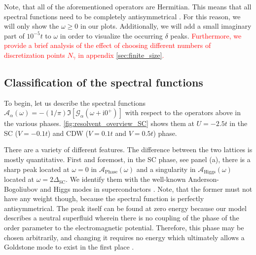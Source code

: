 \documentclass[
    reprint, 
    aps,
    preprintnumbers,
    twocolumn,
    prb,
    superscriptaddress
]{revtex4-2}
\newcommand{\im}{\mathrm{i}}
\newcommand{\spectral}[1]{\mathcal{A}_\text{#1}  (\omega)}
\newcommand{\markEdited}{red}
\begin{document}
Note, that all of the aforementioned operators are Hermitian. 
This means that all spectral functions need to be completely antisymmetrical \cite{rickayzen80}.%
For this reason, we will only show the $\omega \geq 0$ in our plots. 
Additionally, we will add a small imaginary part of $10^{-5}t$ to $\omega$ in order to visualize the occurring $\delta$ peaks.
\textcolor{\markEdited}{Furthermore, we provide a brief analysis of the effect of choosing different numbers of discretization points $N_\gamma$ in appendix \ref{sec:finite_size}.}


\subsection{Classification of the spectral functions}

To begin, let us describe the spectral functions $\mathcal{A}_\alpha (\omega) = - (1/\pi) \Im [\mathcal{G}_\alpha (\omega + \im 0^+)]$ with respect to the operators above in the various phases.
\autoref{fig:resolvent_overview_SC} shows them at $U = -2.5t$ in the SC ($V=-0.1t$) and CDW ($V=0.1t$ and $V=0.5t$) phase.

There are a variety of different features. The difference between the two lattices is mostly quantitative.
First and foremost, in the SC phase, see panel (a), 
there is a sharp peak located at $\omega=0$ in $\spectral{Phase}$ and a singularity in $\spectral{Higgs}$ located at $\omega=2\Delta_\text{SC}$.
We identify them with the well-known Anderson-Bogoliubov and Higgs modes in superconductors \cite{Bogoljubov1958,Anderson58,Brieskorn74,Schmid1975,simanek1975,schoen1976propagating,Kulik1981,Maiti2015,Sun2020,Fan22,Schmid1975,Varma02,Cea14,Measson14,Tsuji15,Krull16,Mueller2019,Schwarz20}.
Note, that the former must not have any weight though, because the spectral function is perfectly antisymmetrical.
The peak itself can be found at zero energy because our model describes a neutral superfluid 
wherein there is no coupling of the phase of the order parameter to the electromagnetic potential.
Therefore, this phase may be chosen arbitrarily, and changing it requires no energy 
which ultimately allows a Goldstone mode to exist in the first place \cite{Goldstone1961,Anderson63}.
\end{document}
